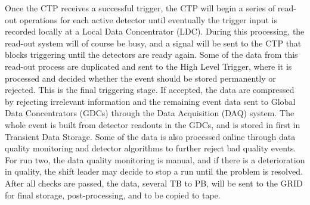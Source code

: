 Once the CTP receives a successful trigger, the CTP will begin a series of read-out operations for each active detector until eventually the trigger input is recorded locally at a Local Data Concentrator (LDC). During this processing, the read-out system will of course be busy, and a signal will be sent to the CTP that blocks triggering until the detectors are ready again. Some of the data from this read-out process are duplicated and sent to the High Level Trigger, where it is processed and decided whether the event should be stored permanently or rejected. This is the final triggering stage. If accepted, the data are compressed by rejecting irrelevant information and the remaining event data sent to Global Data Concentrators (GDCs) through the Data Acquisition (DAQ) system. The whole event is built from detector readouts in the GDCs, and is stored in first in Transient Data Storage. Some of the data is also processed online through data quality monitoring and detector algorithms to further reject bad quality events. For run two, the data quality monitoring is manual, and if there is a deterioration in quality, the shift leader may decide to stop a run until the problem is resolved. After all checks are passed, the data, several TB to PB, will be sent to the GRID for final storage, post-processing, and to be copied to tape.




